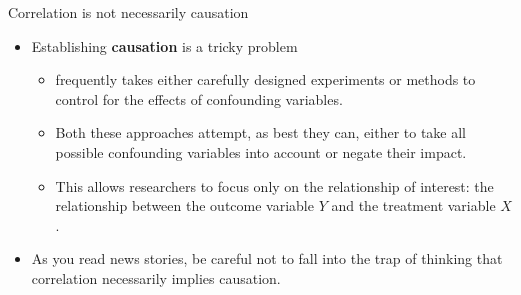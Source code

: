 \documentclass[
  ignorenonframetext,
]{beamer}
\providecommand{\tightlist}{%
  \setlength{\itemsep}{0pt}\setlength{\parskip}{0pt}}
\begin{document}
\begin{frame}{Correlation is not necessarily causation}
\protect\hypertarget{correlation-is-not-necessarily-causation-3}{}
\begin{itemize}
\item
  Establishing \textbf{causation} is a tricky problem

  \begin{itemize}
  \tightlist
  \item
    frequently takes either carefully designed experiments or methods to
    control for the effects of confounding variables.
  \item
    Both these approaches attempt, as best they can, either to take all
    possible confounding variables into account or negate their impact.
  \item
    This allows researchers to focus only on the relationship of
    interest: the relationship between the outcome variable \(Y\) and
    the treatment variable \(X\).
  \end{itemize}
\item
  As you read news stories, be careful not to fall into the trap of
  thinking that correlation necessarily implies causation.
\end{itemize}
\end{frame}
\end{document}
